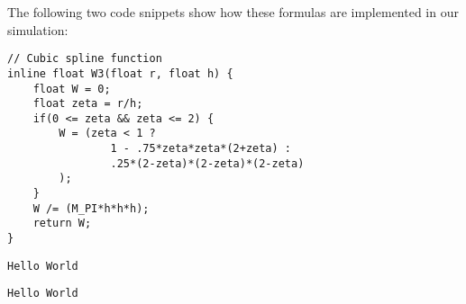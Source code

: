 \documentclass{sigchi}
\begin{document}
%
The following two code snippets show how these formulas are implemented in our simulation:
\begin{lstlisting}[caption=Cubic Spline]
// Cubic spline function
inline float W3(float r, float h) {
	float W = 0;
	float zeta = r/h;
	if(0 <= zeta && zeta <= 2) {
		W = (zeta < 1 ? 
				1 - .75*zeta*zeta*(2+zeta) :
				.25*(2-zeta)*(2-zeta)*(2-zeta)
		);
	}
	W /= (M_PI*h*h*h);
	return W;
}
\end{lstlisting}
%
\begin{lstlisting}[caption=First Derivative of Cubic Spline]
Hello World
\end{lstlisting}
%
\begin{lstlisting}[caption=Second Derivative of Cubic Spline]
Hello World
\end{lstlisting}
\end{document}
